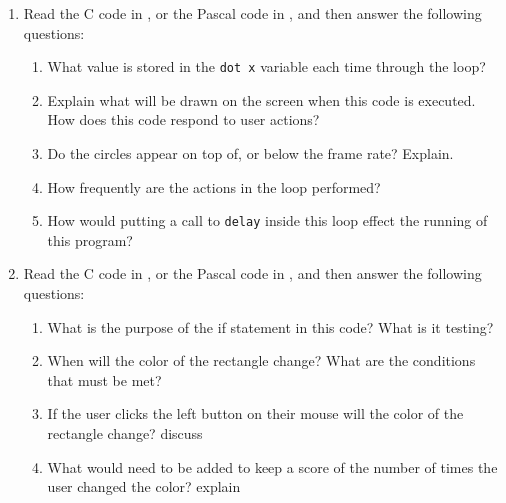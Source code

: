\begin{enumerate}
  \item Read the C code in , or the Pascal code in , and then answer the following questions:
  \begin{enumerate}
    \item What value is stored in the \texttt{dot x} variable each time through the loop?
    \item Explain what will be drawn on the screen when this code is executed. How does this code respond to user actions?
    \item Do the circles appear on top of, or below the frame rate? Explain.
    \item How frequently are the actions in the loop performed?
    \item How would putting a call to \texttt{delay} inside this loop effect the running of this program? 
  \end{enumerate}
  \begin{figure}[h]
  \end{figure}
  \begin{figure}[h]
  \end{figure}
  \clearpage

  \item Read the C code in , or the Pascal code in , and then answer the following questions:
  \begin{enumerate}
    \item What is the purpose of the if statement in this code? What is it testing?
    \item When will the color of the rectangle change? What are the conditions that must be met?
    \item If the user clicks the left button on their mouse will the color of the rectangle change? discuss
    \item What would need to be added to keep a score of the number of times the user changed the color? explain
  \end{enumerate}
  
  \bigskip
  

\end{enumerate}
